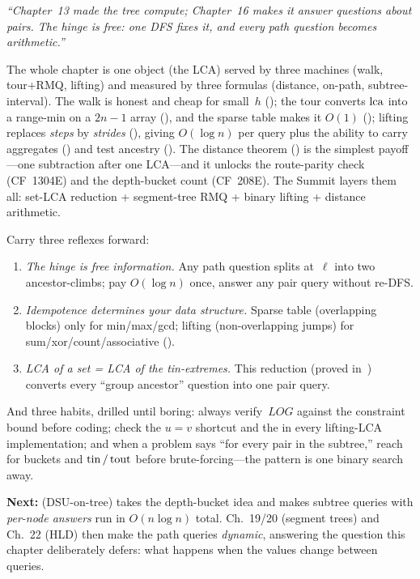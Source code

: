 \begin{lastword}
\emph{``Chapter~13 made the tree compute; Chapter~16 makes it answer
questions about pairs. The hinge is free: one DFS fixes it, and every
path question becomes arithmetic.''}

\medskip
The whole chapter is one object (the LCA) served by three machines
(walk, tour+RMQ, lifting) and measured by three formulas (distance,
on-path, subtree-interval). The walk is honest and cheap for
small~\(h\) (); the tour converts \(\operatorname{lca}\) into a
range-min on a \(2n{-}1\) array (), and the
sparse table makes it \(O(1)\) (); lifting replaces
\emph{steps} by \emph{strides} (), giving \(O(\log n)\)
per query plus the ability to carry aggregates () and
test ancestry (). The distance theorem
() is the simplest payoff---one subtraction after
one LCA---and it unlocks the route-parity check (CF~1304E) and the
depth-bucket count (CF~208E). The Summit layers them all: set-LCA
reduction + segment-tree RMQ + binary lifting + distance arithmetic.

\medskip
Carry three reflexes forward:
\begin{enumerate}[nosep, leftmargin=1.6em]
  \item \emph{The hinge is free information.} Any path question splits
        at~\(\ell\) into two ancestor-climbs; pay \(O(\log n)\) once,
        answer any pair query without re-DFS.
  \item \emph{Idempotence determines your data structure.} Sparse table
        (overlapping blocks) only for min/max/gcd; lifting
        (non-overlapping jumps) for sum/xor/count/associative
        ().
  \item \emph{LCA of a set = LCA of the tin-extremes.} This
        reduction (proved in~) converts every
        ``group ancestor'' question into one pair query.
\end{enumerate}

\medskip
And three habits, drilled until boring: always verify~\(\mathit{LOG}\)
against the constraint bound before coding; check the \(u{=}v\)
shortcut and the  in every lifting-LCA implementation;
and when a problem says ``for every pair in the subtree,'' reach for
buckets and \(\operatorname{tin}/\operatorname{tout}\) before brute-forcing---the
 pattern is one binary search away.

\medskip
\textbf{Next:}  (DSU-on-tree) takes the depth-bucket idea
and makes subtree queries with \emph{per-node answers} run in
\(O(n\log n)\) total. Ch.~19/20 (segment trees) and Ch.~22 (HLD) then
make the path queries \emph{dynamic}, answering the question this
chapter deliberately defers: what happens when the values change
between queries.
\end{lastword}
